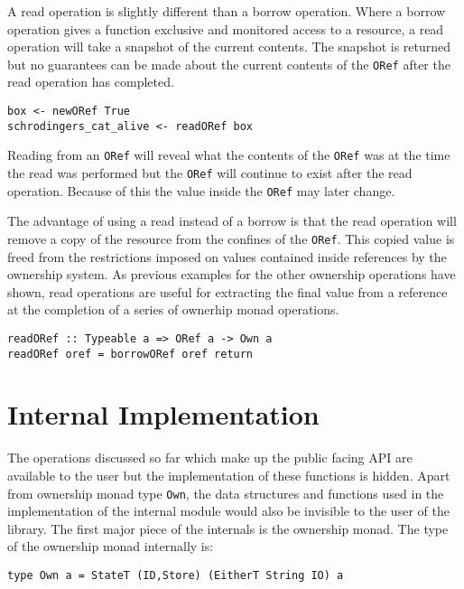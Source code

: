 \documentclass[onehalf,11pt]{beavtex}
\begin{document}
A read operation is slightly different than a borrow operation. Where a borrow
operation gives a function exclusive and monitored access to a resource, a read
operation will take a snapshot of the current contents. The snapshot is returned
but no guarantees can be made about the current contents of the \texttt{ORef}
after the read operation has completed.

\begin{lstlisting}
box <- newORef True
schrodingers_cat_alive <- readORef box
\end{lstlisting}

Reading from an \texttt{ORef} will reveal what the contents of the \texttt{ORef}
was at the time the read was performed but the \texttt{ORef} will continue to
exist after the read operation. Because of this the value inside
the \texttt{ORef} may later change.

The advantage of using a read instead of a borrow is that the read operation will
remove a copy of the resource from the confines of the \texttt{ORef}.
This copied value is freed from the restrictions imposed on values
contained inside references by the ownership system.
As previous examples for the other ownership operations have shown, read
operations are useful for extracting the final value from a reference at the
completion of a series of ownerhip monad operations.

\begin{verbatim}
readORef :: Typeable a => ORef a -> Own a
readORef oref = borrowORef oref return
\end{verbatim}

\section{Internal Implementation}

The operations discussed so far which make up the public facing API are
available to the user but the implementation of these functions is hidden.
Apart from ownership monad type \texttt{Own},
the data structures and functions used in the implementation of the internal
module would also be invisible to the user of the library. The first major
piece of the internals is the ownership monad. The type of the ownership monad
internally is:

\begin{verbatim}
type Own a = StateT (ID,Store) (EitherT String IO) a
\end{verbatim}
\end{document}
